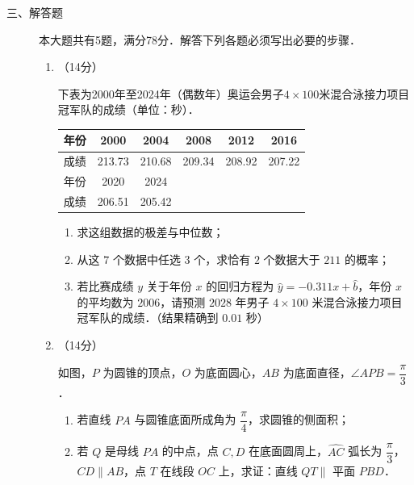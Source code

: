 \begin{description}
    \item[三、解答题] 本大题共有5题，满分78分．解答下列各题必须写出必要的步骤．
    \begin{enumerate}[leftmargin=5pt]
      \addtocounter{enumi}{+16}
        \item （14分）

        下表为2000年至2024年（偶数年）奥运会男子$4\times100$米混合泳接力项目冠军队的成绩（单位：秒）．
        \begin{table}[H]
        \centering
        \begin{tabular}{|c|c|c|c|c|c|}
        \hline
        年份 & 2000 & 2004 & 2008 & 2012 & 2016 \\
        \hline
        成绩 & 213.73 & 210.68 & 209.34 & 208.92 & 207.22 \\
        \hline
        年份 & 2020 & 2024 & & & \\
        \hline
        成绩 & 206.51 & 205.42 & & & \\
        \hline
        \end{tabular}
        \end{table}

        \begin{enumerate}[label=(\arabic*)]
            \item 求这组数据的极差与中位数；
            \item 从这 $7$ 个数据中任选 $3$ 个，求恰有 $2$ 个数据大于 $211$ 的概率；
            \item 若比赛成绩 $y$ 关于年份 $x$ 的回归方程为 $\hat{y}=-0.311x+\hat{b}$，年份 $x$ 的平均数为 $2006$，请预测 $2028$ 年男子 $4\times100$ 米混合泳接力项目冠军队的成绩．（结果精确到 $0.01$ 秒）
        \end{enumerate}

        \item （14分）

        如图，$P$ 为圆锥的顶点，$O$ 为底面圆心，$AB$ 为底面直径，$\angle APB=\dfrac{\pi}{3}$．

        \begin{enumerate}[label=(\arabic*)]
            \item 若直线 $PA$ 与圆锥底面所成角为 $\dfrac{\pi}{4}$，求圆锥的侧面积；
            \item 若 $Q$ 是母线 $PA$ 的中点，点 $C,D$ 在底面圆周上，$\widehat{AC}$ 弧长为 $\dfrac{\pi}{3}$，$CD\parallel AB$，点 $T$ 在线段 $OC$ 上，求证：直线 $QT\parallel$ 平面 $PBD$．
        \end{enumerate}


\end{enumerate}
\end{description}
